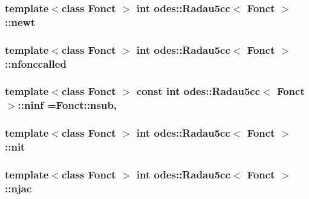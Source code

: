 \hypertarget{classodes_1_1Radau5cc_a957de41c2a36e2f254836a6c05dbfb92}{
\subsubsection[{newt}]{\setlength{\rightskip}{0pt plus 5cm}template$<$class Fonct $>$ int {\bf odes\-::\-Radau5cc}$<$ Fonct $>$\-::newt\hspace{0.3cm}{\ttfamily [private]}}}\label{classodes_1_1Radau5cc_a957de41c2a36e2f254836a6c05dbfb92}
\hypertarget{classodes_1_1Radau5cc_a6363884e5172cc77c13a1d9ca9ed630a}{
\subsubsection[{nfonccalled}]{\setlength{\rightskip}{0pt plus 5cm}template$<$class Fonct $>$ int {\bf odes\-::\-Radau5cc}$<$ Fonct $>$\-::nfonccalled\hspace{0.3cm}{\ttfamily [private]}}}\label{classodes_1_1Radau5cc_a6363884e5172cc77c13a1d9ca9ed630a}
\hypertarget{classodes_1_1Radau5cc_ac47e67a43369971eeb08c2d2200a76d5}{
\subsubsection[{ninf}]{\setlength{\rightskip}{0pt plus 5cm}template$<$class Fonct $>$ const int {\bf odes\-::\-Radau5cc}$<$ Fonct $>$\-::ninf =Fonct\-::nsub\hspace{0.3cm}{\ttfamily [static]}, {\ttfamily [private]}}}\label{classodes_1_1Radau5cc_ac47e67a43369971eeb08c2d2200a76d5}
\hypertarget{classodes_1_1Radau5cc_a98eae21674bed3d783e49f92f7c38a20}{
\subsubsection[{nit}]{\setlength{\rightskip}{0pt plus 5cm}template$<$class Fonct $>$ int {\bf odes\-::\-Radau5cc}$<$ Fonct $>$\-::nit\hspace{0.3cm}{\ttfamily [private]}}}\label{classodes_1_1Radau5cc_a98eae21674bed3d783e49f92f7c38a20}
\hypertarget{classodes_1_1Radau5cc_ade6f8961bd6dacdc3e89761d8af04172}{
\subsubsection[{njac}]{\setlength{\rightskip}{0pt plus 5cm}template$<$class Fonct $>$ int {\bf odes\-::\-Radau5cc}$<$ Fonct $>$\-::njac\hspace{0.3cm}{\ttfamily [private]}}}\label{classodes_1_1Radau5cc_ade6f8961bd6dacdc3e89761d8af04172}
